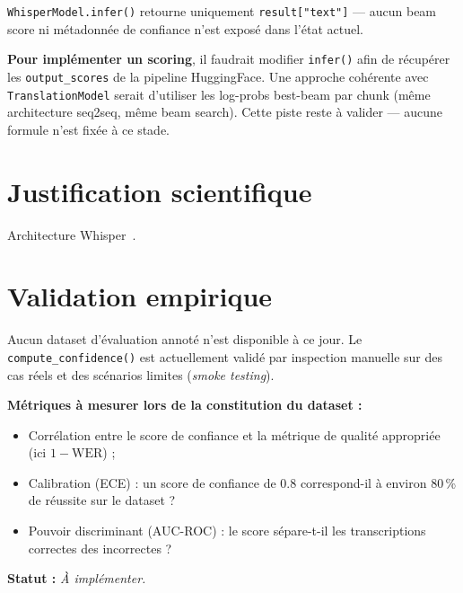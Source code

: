 \texttt{WhisperModel.infer()} retourne uniquement \texttt{result["text"]} ---
aucun beam score ni métadonnée de confiance n'est exposé dans l'état actuel.

\textbf{Pour implémenter un scoring}, il faudrait modifier \texttt{infer()} afin
de récupérer les \texttt{output\_scores} de la pipeline HuggingFace.
Une approche cohérente avec \texttt{TranslationModel} serait d'utiliser
les log-probs best-beam par chunk (même architecture seq2seq, même beam search).
Cette piste reste à valider --- aucune formule n'est fixée à ce stade.

\section{Justification scientifique}

Architecture Whisper~\cite{radford2022whisper}.

\section{Validation empirique}

Aucun dataset d'évaluation annoté n'est disponible à ce jour. Le
\texttt{compute\_confidence()} est actuellement validé par inspection manuelle
sur des cas réels et des scénarios limites (\textit{smoke testing}).

\noindent\textbf{Métriques à mesurer lors de la constitution du dataset :}
\begin{itemize}
  \item Corrélation entre le score de confiance et la métrique de qualité
    appropriée (ici $1 - \mathrm{WER}$) ;
  \item Calibration (ECE) : un score de confiance de 0.8 correspond-il à
    environ 80\,\% de réussite sur le dataset ?
  \item Pouvoir discriminant (AUC-ROC) : le score sépare-t-il les transcriptions
    correctes des incorrectes ?
\end{itemize}

\noindent\textbf{Statut :} \textit{À implémenter.}
